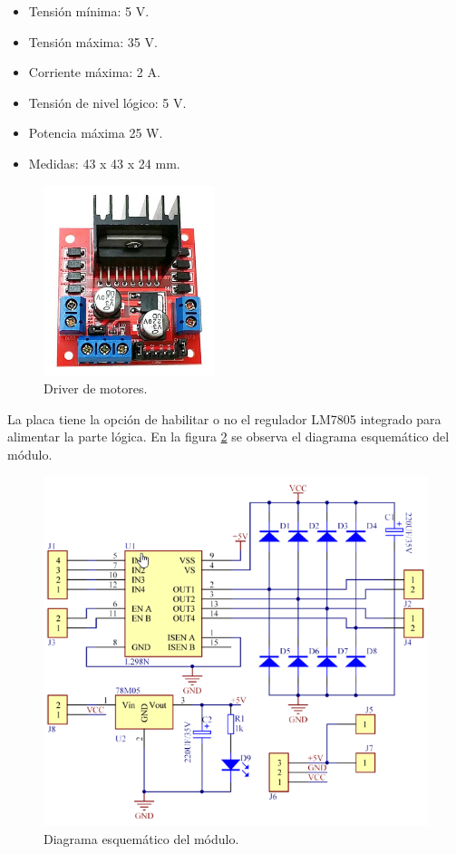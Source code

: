 \begin{itemize}
	\item Tensión mínima: 5 V.
	\item Tensión máxima: 35 V.
	\item Corriente máxima: 2 A.
	\item Tensión de nivel lógico: 5 V.
	\item Potencia máxima 25 W.
	\item Medidas: 43 x 43 x 24 mm.
\end{itemize}
\pagebreak

\begin{figure}[h]
	\centering
	\includegraphics[width=5cm]{./Figures/L298N.png}
	\caption{Driver de motores\protect\footnotemark.}
	\label{fig:Driver}
\end{figure}


La placa tiene la opción de habilitar o no el regulador LM7805 integrado para alimentar la parte lógica. En la figura \ref{fig:Esquema} se observa el diagrama esquemático del módulo.


\begin{figure}[h]
	\centering
	\includegraphics[width=12cm]{./Figures/Modulo.png}
	\caption{Diagrama esquemático del módulo\protect\footnotemark.}
	\label{fig:Esquema}
\end{figure}




